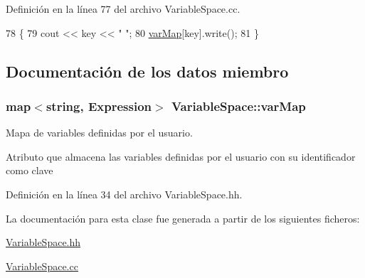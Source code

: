Definición en la línea 77 del archivo Variable\+Space.\+cc.


\begin{DoxyCode}
78 \{
79   cout << key << \textcolor{stringliteral}{" "};
80   \hyperlink{class_variable_space_a5af4ff4cfb476da8de2ffd88e511dd01}{varMap}[key].write();
81 \}
\end{DoxyCode}


\subsection{Documentación de los datos miembro}
\subsubsection[{\texorpdfstring{var\+Map}{varMap}}]{\setlength{\rightskip}{0pt plus 5cm}map$<$string, {\bf Expression}$>$ Variable\+Space\+::var\+Map\hspace{0.3cm}{\ttfamily [private]}}\hypertarget{class_variable_space_a5af4ff4cfb476da8de2ffd88e511dd01}{}\label{class_variable_space_a5af4ff4cfb476da8de2ffd88e511dd01}


Mapa de variables definidas por el usuario. 

Atributo que almacena las variables definidas por el usuario con su identificador como clave 

Definición en la línea 34 del archivo Variable\+Space.\+hh.



La documentación para esta clase fue generada a partir de los siguientes ficheros\+:\begin{DoxyCompactItemize}
\item 
\hyperlink{_variable_space_8hh}{Variable\+Space.\+hh}\item 
\hyperlink{_variable_space_8cc}{Variable\+Space.\+cc}\end{DoxyCompactItemize}

